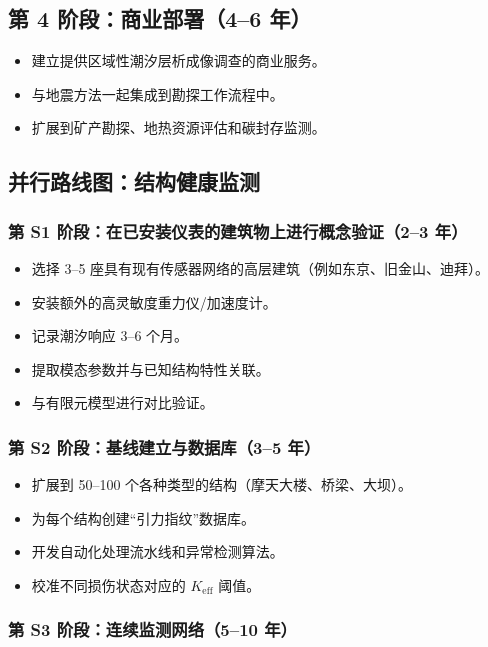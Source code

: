 \documentclass[12pt,a4paper]{article}
\theoremstyle{remark}
\begin{document}
	\subsection{第 4 阶段：商业部署（4–6 年）}
	
	\begin{itemize}
		\item 建立提供区域性潮汐层析成像调查的商业服务。
		\item 与地震方法一起集成到勘探工作流程中。
		\item 扩展到矿产勘探、地热资源评估和碳封存监测。
	\end{itemize}
	
	\subsection{并行路线图：结构健康监测}
	
	\subsubsection{第 S1 阶段：在已安装仪表的建筑物上进行概念验证（2–3 年）}
	
	\begin{itemize}
		\item 选择 3–5 座具有现有传感器网络的高层建筑（例如东京、旧金山、迪拜）。
		\item 安装额外的高灵敏度重力仪/加速度计。
		\item 记录潮汐响应 3–6 个月。
		\item 提取模态参数并与已知结构特性关联。
		\item 与有限元模型进行对比验证。
	\end{itemize}
	
	\subsubsection{第 S2 阶段：基线建立与数据库（3–5 年）}
	
	\begin{itemize}
		\item 扩展到 50–100 个各种类型的结构（摩天大楼、桥梁、大坝）。
		\item 为每个结构创建“引力指纹”数据库。
		\item 开发自动化处理流水线和异常检测算法。
		\item 校准不同损伤状态对应的 \(K_{\mathrm{eff}}\) 阈值。
	\end{itemize}
	
	\subsubsection{第 S3 阶段：连续监测网络（5–10 年）}
	
\end{document}
